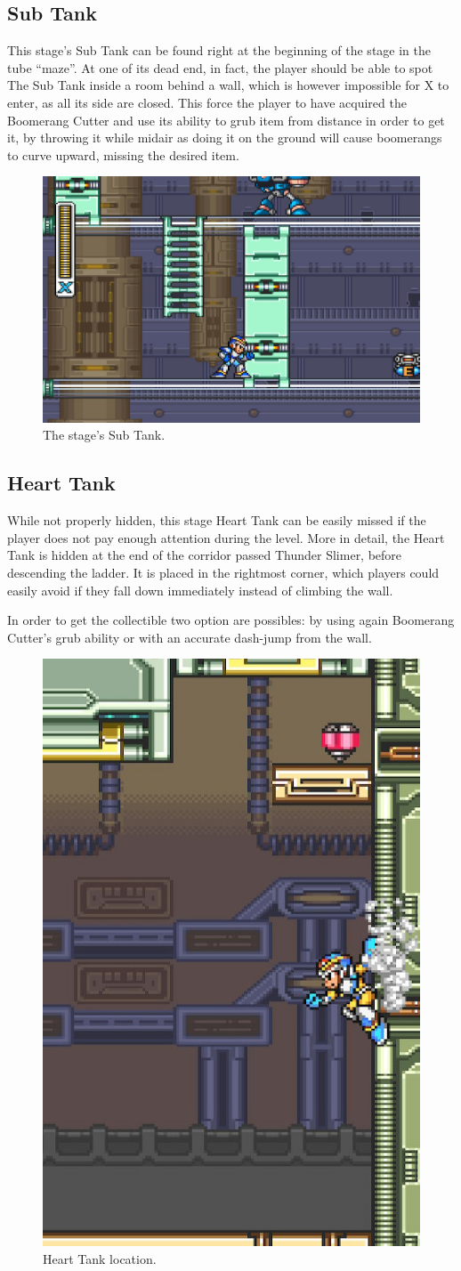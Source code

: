 \subsection{Sub Tank}
This stage's Sub Tank can be found right at the beginning of the stage in the tube ``maze''. At one of its dead end, in fact, the player should be able to spot The Sub Tank inside a room behind a wall, which is however impossible for X to enter, as all its side are closed. This force the player to have acquired the Boomerang Cutter and use its ability to grub item from distance in order to get it, by throwing it while midair as doing it on the ground will cause boomerangs to curve upward, missing the desired item.
\begin{figure}[htp]
	\centering
	\includegraphics[width=0.45\linewidth]{figures/X1/Spark_mandrill/Mandrill_tank.jpg}
	\caption{The stage's Sub Tank.}
\end{figure}

\subsection{Heart Tank}
While not properly hidden, this stage Heart Tank can be easily missed if the player does not pay enough attention during the level. More in detail, the Heart Tank is hidden at the end of the corridor passed Thunder Slimer, before descending the ladder. It is placed in the rightmost corner, which players could easily avoid if they fall down immediately instead of climbing the wall.

In order to get the collectible two option are possibles: by using again Boomerang Cutter's grub ability or with an accurate dash-jump from the wall.
\begin{figure}[htp]
	\centering
	\includegraphics[width=0.3\linewidth]{figures/X1/Spark_mandrill/Mandrill_heart.jpg}
	\caption{Heart Tank location.}
\end{figure}


